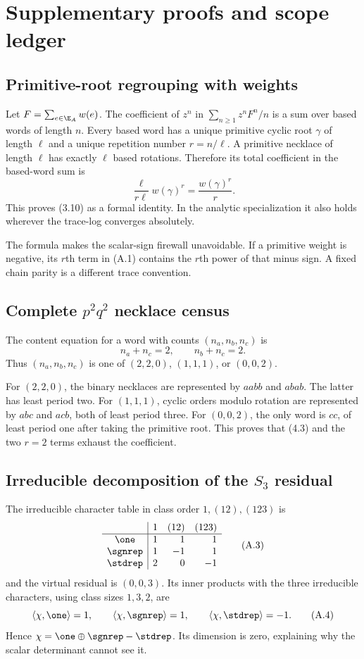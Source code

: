 \section{Supplementary proofs and scope ledger}
\label{app:proofs}

\subsection{Primitive-root regrouping with weights}

Let $F=\sum_{e\in\E_A}w(e)$.  The coefficient of $z^n$ in
$\sum_{n\ge1}z^nF^n/n$ is a sum over based words of length $n$.  Every based
word has a unique primitive cyclic root $\gamma$ of length $\ell$ and a
unique repetition number $r=n/\ell$.  A primitive necklace of length $\ell$
has exactly $\ell$ based rotations.  Therefore its total coefficient in the
based-word sum is
\[
  \frac{\ell}{r\ell}w(\gamma)^r=\frac{w(\gamma)^r}{r}.
  \tag{A.1}
\]
This proves (3.10) as a formal identity.  In the analytic specialization it
also holds wherever the trace-log converges absolutely.

The formula makes the scalar-sign firewall unavoidable.  If a primitive
weight is negative, its $r$th term in (A.1) contains the $r$th power of that
minus sign.  A fixed chain parity is a different trace convention.

\subsection{Complete \texorpdfstring{$p^2q^2$}{p2q2} necklace census}

The content equation for a word with counts $(n_a,n_b,n_c)$ is
\[
  n_a+n_c=2,\qquad n_b+n_c=2.
  \tag{A.2}
\]
Thus $(n_a,n_b,n_c)$ is one of $(2,2,0)$, $(1,1,1)$, or $(0,0,2)$.

For $(2,2,0)$, the binary necklaces are represented by $aabb$ and $abab$.
The latter has least period two.  For $(1,1,1)$, cyclic orders modulo rotation
are represented by $abc$ and $acb$, both of least period three.  For
$(0,0,2)$, the only word is $cc$, of least period one after taking the
primitive root.  This proves that (4.3) and the two $r=2$ terms exhaust the
coefficient.

\subsection{Irreducible decomposition of the \texorpdfstring{$S_3$}{S3} residual}

The irreducible character table in class order
$1,(12),(123)$ is
\[
\begin{array}{c|rrr}
 &1&(12)&(123)\\ \hline
\one&1&1&1\\
\sgnrep&1&-1&1\\
\stdrep&2&0&-1
\end{array}
\tag{A.3}
\]
and the virtual residual is $(0,0,3)$.  Its inner products with the three
irreducible characters, using class sizes $1,3,2$, are
\[
  \langle\chi,\one\rangle=1,
  \qquad
  \langle\chi,\sgnrep\rangle=1,
  \qquad
  \langle\chi,\stdrep\rangle=-1.
  \tag{A.4}
\]
Hence $\chi=\one\oplus\sgnrep-\stdrep$.  Its dimension is zero, explaining
why the scalar determinant cannot see it.

